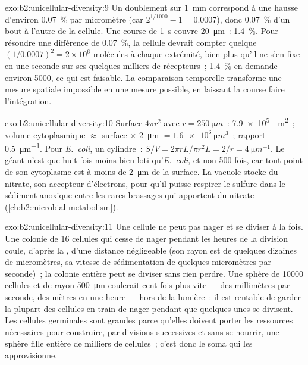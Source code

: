 \begin{solution}{exo:b2:unicellular-diversity:9}
Un doublement sur \qty{1}{mm} correspond à une hausse d'environ
\qty{0.07}{\%} par micromètre (car $2^{1/1000} - 1 = 0.0007$), donc
\qty{0.07}{\%} d'un bout à l'autre de la cellule. Une course de
\qty{1}{s} couvre \qty{20}{\micro m}~: \qty{1.4}{\%}. Pour résoudre une
différence de \qty{0.07}{\%}, la cellule devrait compter quelque
$(1/0.0007)^2 = 2\times 10^6$ molécules à chaque extrémité, bien plus
qu'il ne s'en fixe en une seconde sur ses quelques milliers de
récepteurs~; \qty{1.4}{\%} en demande environ \num{5000}, ce qui est
faisable. La comparaison temporelle transforme une mesure spatiale
impossible en une mesure possible, en laissant la course faire
l'intégration.
\end{solution}

\begin{solution}{exo:b2:unicellular-diversity:10}
Surface $4\pi r^2$ avec $r = \qty{250}{\micro m}$~: \qty{7.9e5}{\micro
m^2}~; volume cytoplasmique $\approx$ surface $\times$ \qty{2}{\micro m}
$= \qty{1.6e6}{\micro m^3}$~; rapport \qty{0.5}{\micro m^{-1}}. Pour
\emph{E.~coli}, un cylindre~: $S/V = 2\pi r L/\pi r^2 L = 2/r =
\qty{4}{\micro m^{-1}}$. Le géant n'est que huit fois moins bien loti
qu'\emph{E.~coli}, et non 500 fois, car tout point de son cytoplasme
est à moins de \qty{2}{\micro m} de la surface. La vacuole stocke du
nitrate, son accepteur d'électrons, pour qu'il puisse respirer le
sulfure dans le sédiment anoxique entre les rares brassages qui
apportent du nitrate (\cref{ch:b2:microbial-metabolism}).
\end{solution}

\begin{solution}{exo:b2:unicellular-diversity:11}
Une cellule ne peut pas nager et se diviser à la fois. Une colonie de
16 cellules qui cesse de nager pendant les heures de la division coule,
d'après la , d'une distance négligeable (son rayon est de
quelques dizaines de micromètres, sa vitesse de sédimentation de
quelques micromètres par seconde)~; la colonie entière peut se diviser
sans rien perdre. Une sphère de \num{10000} cellules et de rayon
\qty{500}{\micro m} coulerait cent fois plus vite ---
des millimètres par seconde, des mètres en une heure --- hors de la
lumière~: il est rentable de garder la plupart des cellules en train de
nager pendant que quelques-unes se divisent. Les cellules germinales
sont grandes parce qu'elles doivent porter les ressources nécessaires
pour construire, par divisions successives et sans se nourrir, une
sphère fille entière de milliers de cellules~; c'est donc le soma qui
les approvisionne.
\end{solution}

